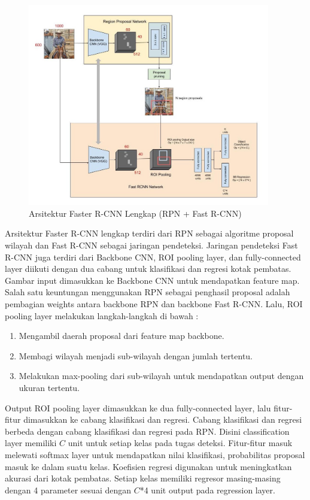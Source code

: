 \documentclass{article}
\begin{document}
   	\begin{figure}[H]
   		\centering
   		\includegraphics[width=400px]{arsitektur/full_architecture.jpeg}
   		\caption{Arsitektur Faster R-CNN Lengkap (RPN + Fast R-CNN)}
   	\end{figure}
   	
   	\par Arsitektur Faster R-CNN lengkap terdiri dari RPN sebagai algoritme proposal wilayah dan Fast R-CNN sebagai jaringan pendeteksi. Jaringan pendeteksi Fast R-CNN juga terdiri dari Backbone CNN, ROI pooling layer, dan fully-connected layer diikuti dengan dua cabang untuk klasifikasi dan regresi kotak pembatas. Gambar input dimasukkan ke Backbone CNN untuk mendapatkan feature map. Salah satu keuntungan menggunakan RPN sebagai penghasil proposal adalah pembagian weights antara backbone RPN dan backbone Fast R-CNN. Lalu, ROI pooling layer melakukan langkah-langkah di bawah :
   	\begin{enumerate}
   		\item Mengambil daerah proposal dari feature map backbone.
   		\item Membagi wilayah menjadi sub-wilayah dengan jumlah tertentu.
   		\item Melakukan max-pooling dari sub-wilayah untuk mendapatkan output dengan ukuran tertentu.
   	\end{enumerate}
   
   	\par Output ROI pooling layer dimasukkan ke dua fully-connected layer, lalu fitur-fitur dimasukkan ke cabang klasifikasi dan regresi. Cabang klasifikasi dan regresi berbeda dengan cabang klasifikasi dan regresi pada RPN. Disini classification layer memiliki $C$ unit untuk setiap kelas pada tugas deteksi. Fitur-fitur masuk melewati softmax layer untuk mendapatkan nilai klasifikasi, probabilitas proposal masuk ke dalam suatu kelas. Koefisien regresi digunakan untuk meningkatkan akurasi dari kotak pembatas. Setiap kelas memiliki regresor masing-masing dengan 4 parameter sesuai dengan $C$*4 unit output pada regression layer.
   	
\end{document}
